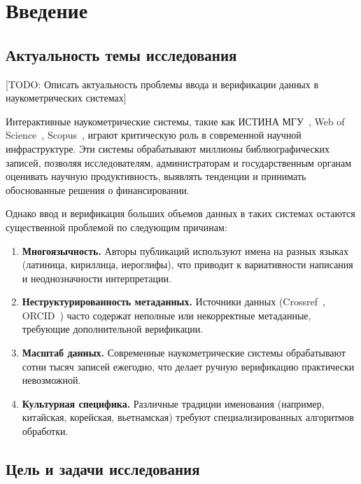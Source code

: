
\chapter{Введение}
\label{ch:introduction}

\section{Актуальность темы исследования}
\label{sec:intro:relevance}

[TODO: Описать актуальность проблемы ввода и верификации данных в наукометрических системах]

Интерактивные наукометрические системы, такие как ИСТИНА МГУ~\cite{TODO:istina}, Web of Science~\cite{TODO:wos}, Scopus~\cite{TODO:scopus}, играют критическую роль в современной научной инфраструктуре. Эти системы обрабатывают миллионы библиографических записей, позволяя исследователям, администраторам и государственным органам оценивать научную продуктивность, выявлять тенденции и принимать обоснованные решения о финансировании.

Однако ввод и верификация больших объемов данных в таких системах остаются существенной проблемой по следующим причинам:

\begin{enumerate}
    \item \textbf{Многоязычность.} Авторы публикаций используют имена на разных языках (латиница, кириллица, иероглифы), что приводит к вариативности написания и неоднозначности интерпретации.

    \item \textbf{Неструктурированность метаданных.} Источники данных (Crossref~\cite{TODO:crossref}, ORCID~\cite{TODO:orcid}) часто содержат неполные или некорректные метаданные, требующие дополнительной верификации.

    \item \textbf{Масштаб данных.} Современные наукометрические системы обрабатывают сотни тысяч записей ежегодно, что делает ручную верификацию практически невозможной.

    \item \textbf{Культурная специфика.} Различные традиции именования (например, китайская, корейская, вьетнамская) требуют специализированных алгоритмов обработки.
\end{enumerate}

\section{Цель и задачи исследования}
\label{sec:intro:objectives}

